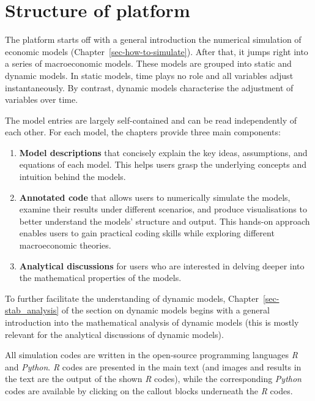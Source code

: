 \documentclass[
  letterpaper,
  DIV=11,
  numbers=noendperiod]{scrreprt}
\providecommand{\tightlist}{%
  \setlength{\itemsep}{0pt}\setlength{\parskip}{0pt}}\usepackage{longtable,booktabs,array}
\begin{document}
\section{Structure of platform}\label{structure-of-platform}

The platform starts off with a general introduction the numerical
simulation of economic models (Chapter~\ref{sec-how-to-simulate}). After
that, it jumps right into a series of macroeconomic models. These models
are grouped into static and dynamic models. In static models, time plays
no role and all variables adjust instantaneously. By contrast, dynamic
models characterise the adjustment of variables over time.

The model entries are largely self-contained and can be read
independently of each other. For each model, the chapters provide three
main components:

\begin{enumerate}
\def\labelenumi{\arabic{enumi}.}
\tightlist
\item
  \textbf{Model descriptions} that concisely explain the key ideas,
  assumptions, and equations of each model. This helps users grasp the
  underlying concepts and intuition behind the models.
\item
  \textbf{Annotated code} that allows users to numerically simulate the
  models, examine their results under different scenarios, and produce
  visualisations to better understand the models' structure and output.
  This hands-on approach enables users to gain practical coding skills
  while exploring different macroeconomic theories.
\item
  \textbf{Analytical discussions} for users who are interested in
  delving deeper into the mathematical properties of the models.
\end{enumerate}

To further facilitate the understanding of dynamic models,
Chapter~\ref{sec-stab_analysis} of the section on dynamic models begins
with a general introduction into the mathematical analysis of dynamic
models (this is mostly relevant for the analytical discussions of
dynamic models).

All simulation codes are written in the open-source programming
languages \emph{R} and \emph{Python}. \emph{R} codes are presented in
the main text (and images and results in the text are the output of the
shown \emph{R} codes), while the corresponding \emph{Python} codes are
available by clicking on the callout blocks underneath the \emph{R}
codes.
\end{document}
